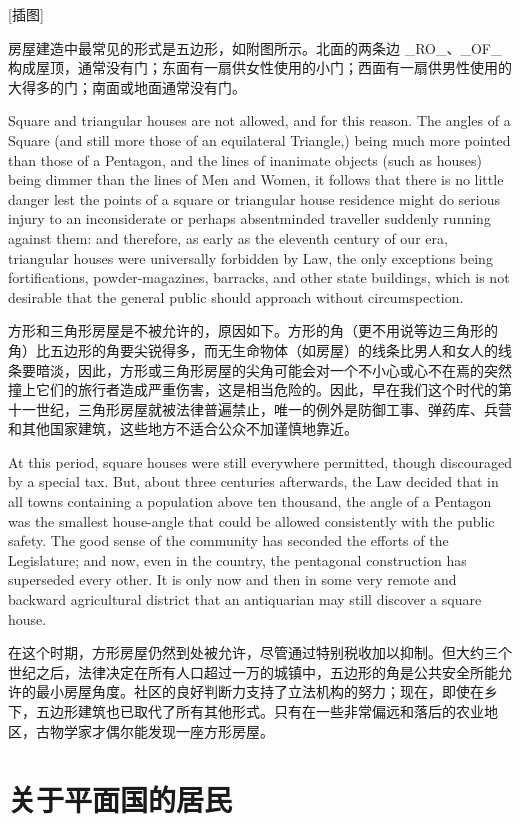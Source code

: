 \documentclass[12pt,UTF8]{ctexbook}
\begin{document}
[插图]

房屋建造中最常见的形式是五边形，如附图所示。北面的两条边 \_RO\_、\_OF\_ 构成屋顶，通常没有门；东面有一扇供女性使用的小门；西面有一扇供男性使用的大得多的门；南面或地面通常没有门。

Square and triangular houses are not allowed, and for this reason. The angles of a Square (and still more those of an equilateral Triangle,) being much more pointed than those of a Pentagon, and the lines of inanimate objects (such as houses) being dimmer than the lines of Men and Women, it follows that there is no little danger lest the points of a square or triangular house residence might do serious injury to an inconsiderate or perhaps absentminded traveller suddenly running against them: and therefore, as early as the eleventh century of our era, triangular houses were universally forbidden by Law, the only exceptions being fortifications, powder-magazines, barracks, and other state buildings, which is not desirable that the general public should approach without circumspection.

方形和三角形房屋是不被允许的，原因如下。方形的角（更不用说等边三角形的角）比五边形的角要尖锐得多，而无生命物体（如房屋）的线条比男人和女人的线条要暗淡，因此，方形或三角形房屋的尖角可能会对一个不小心或心不在焉的突然撞上它们的旅行者造成严重伤害，这是相当危险的。因此，早在我们这个时代的第十一世纪，三角形房屋就被法律普遍禁止，唯一的例外是防御工事、弹药库、兵营和其他国家建筑，这些地方不适合公众不加谨慎地靠近。

At this period, square houses were still everywhere permitted, though discouraged by a special tax. But, about three centuries afterwards, the Law decided that in all towns containing a population above ten thousand, the angle of a Pentagon was the smallest house-angle that could be allowed consistently with the public safety. The good sense of the community has seconded the efforts of the Legislature; and now, even in the country, the pentagonal construction has superseded every other. It is only now and then in some very remote and backward agricultural district that an antiquarian may still discover a square house.

在这个时期，方形房屋仍然到处被允许，尽管通过特别税收加以抑制。但大约三个世纪之后，法律决定在所有人口超过一万的城镇中，五边形的角是公共安全所能允许的最小房屋角度。社区的良好判断力支持了立法机构的努力；现在，即使在乡下，五边形建筑也已取代了所有其他形式。只有在一些非常偏远和落后的农业地区，古物学家才偶尔能发现一座方形房屋。

\chapter{关于平面国的居民}
\end{document}

